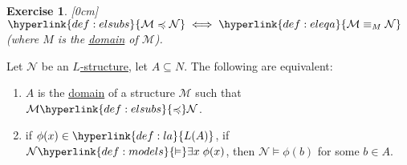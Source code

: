 \documentclass{article}
\let\models\vDash
\newtheorem{nexercise}[nthm]{Exercise}
\begin{document}
\begin{nexercise}\label{ex:3.7}
  [0cm]
  $ \hyperlink{def:elsubs}{\mathcal{M}\preccurlyeq \mathcal{N}} \iff \hyperlink{def:eleqa}{\mathcal{M} \equiv_M \mathcal{N}}$ (where $M$ is the \hyperlink{def:lstr}{domain} of $\mathcal{M}$).
\end{nexercise}
\begin{nlemma}\label{lem:3.8}
  Let $\mathcal{N}$ be an \hyperlink{def:lstr}{$L$-structure}, let $A \subseteq N$. The following are equivalent:
  \begin{enumerate}[label=(\roman*)]
    \item $A$ is the \hyperlink{def:lstr}{domain} of a structure $\mathcal{M}$ such that $\mathcal{M} \hyperlink{def:elsubs}{\preccurlyeq} \mathcal{N}$.
    \item if $\phi(x) \in \hyperlink{def:la}{L(A)}$, if $\mathcal{N} \hyperlink{def:models}{\models} \exists x \; \phi(x)$, then $\mathcal{N} \models \phi(b)$ for some $b \in A$.
  \end{enumerate}
\end{nlemma}
\end{document}
